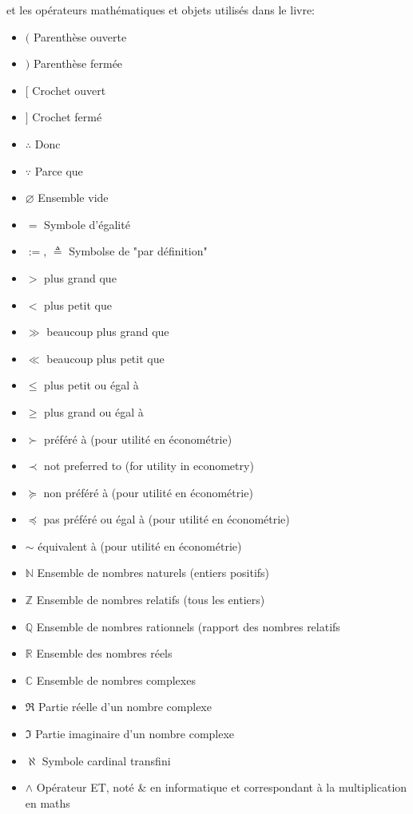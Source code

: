 	et les opérateurs mathématiques et objets utilisés dans le livre:
	\begin{itemize}[label={},leftmargin=0.5cm]
		\setlength{\itemsep}{1pt}
  		\item $($ Parenthèse ouverte
  		\item $)$ Parenthèse fermée
  		\item $[$ Crochet ouvert
  		\item $]$ Crochet fermé
  		\item $\therefore$ Donc
  		\item $\because$ Parce que
	 	\item $\varnothing$ Ensemble vide
	 	\item $=$ Symbole d'égalité
	 	\item $:=$, $\triangleq$ Symbolse de "par définition"
	 	\item $>$ plus grand que
	 	\item $<$ plus petit que
	 	\item $\gg$ beaucoup plus grand que
	 	\item $\ll$ beaucoup plus petit que
	 	\item $\leq$ plus petit ou égal à
	 	\item $\geq$ plus grand ou égal à
	 	\item $\succ$ préféré à (pour utilité en économétrie)
	 	\item $\prec$ not preferred to (for utility in econometry)
	 	\item $\succeq$ non préféré à (pour utilité en économétrie)
	 	\item $\preceq$ pas préféré ou égal à (pour utilité en économétrie)
	 	\item $\sim$ équivalent à (pour utilité en économétrie)
	 	\item $\mathbb{N}$ Ensemble de nombres naturels (entiers positifs)
	 	\item $\mathbb{Z}$ Ensemble de nombres relatifs (tous les entiers)
	 	\item $\mathbb{Q}$ Ensemble de nombres rationnels (rapport des nombres relatifs
	 	\item $\mathbb{R}$ Ensemble des nombres réels
	 	\item $\mathbb{C}$ Ensemble de nombres complexes
	 	\item $\Re$ Partie réelle d'un nombre complexe
	 	\item $\Im$ Partie imaginaire d'un nombre complexe
	 	\item $\aleph$ Symbole cardinal transfini
	 	\item $\wedge$ Opérateur ET, noté \& en informatique et correspondant à la multiplication en maths

\end{itemize}
